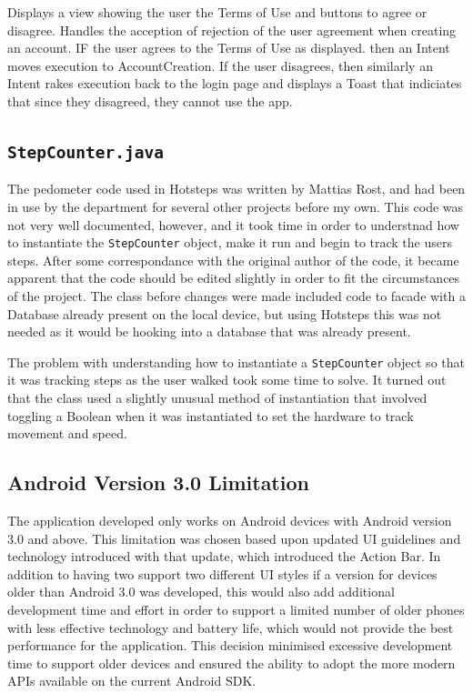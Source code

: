 \documentclass{l4proj}
\begin{document}
Displays a view showing the user the Terms of Use and buttons to agree or disagree. Handles the acception of rejection of the user agreement when creating an account. IF the user agrees to the Terms of Use as displayed. then an Intent moves execution to AccountCreation. If the user disagrees, then similarly an Intent rakes execution back to the login page and displays a Toast that indiciates that since they disagreed, they cannot use the app.

\subsection{\texttt{StepCounter.java}}

The pedometer code used in Hotsteps was written by Mattias Rost, and had been in use by the department for several other projects before my own. This code was not very well documented, however, and it took time in order to understnad how to instantiate the \texttt{StepCounter} object, make it run and begin to track the users steps.  After some correspondance with the original author of the code, it became apparent that the code should be edited slightly in order to fit the circumstances of the project. The class before changes were made included code to facade with a Database already present on the local device, but using Hotsteps this was not needed as it would be hooking into a database that was already present.

The problem with understanding how to instantiate a \texttt{StepCounter} object so that it was tracking steps as the user walked took some time to solve. It turned out that the class used a slightly unusual method of instantiation that involved toggling a Boolean when it was instantiated to set the hardware to track movement and speed.

\subsection{Android Version 3.0 Limitation}

The application developed only works on Android devices with Android version 3.0 and above. This limitation was chosen based upon updated UI guidelines and technology introduced with that update, which introduced the Action Bar. In addition to having two support two different UI styles if a version for devices older than Android 3.0 was developed, this would also add additional development time and effort in order to support a limited number of older phones with less effective technology and battery life, which would not provide the best performance for the application. This decision minimised excessive development time to support older devices and ensured the ability to adopt the more modern APIs available on the current Android SDK.
\end{document}
